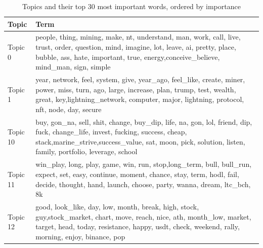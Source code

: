 \documentclass[
]{article}
\begin{document}
\begin{table}

\caption{\label{tab:topictable}Topics and their top 30 most important words, ordered by importance}
\centering
\begin{tabular}[t]{l|l}
\hline
Topic & Term\\
\hline
Topic 0 & people,           thing,          mining,            make,              nt,      understand,             man,            work,            call,            live,           trust,           order,        question,            mind,         imagine,             lot,           leave,              ai,          pretty,           place,          bubble,             ass,            hate,       important,            true,          energy,conceive\_believe,        mind\_man,            sign,          simple\\
\hline
Topic 1 & year,          network,             feel,           system,             give,         year\_ago,        feel\_like,           create,            miner,            power,             miss,             turn,              ago,            large,         increase,             plan,            trump,             test,           wealth,            great,              key,lightning\_network,         computer,            major,        lightning,         protocol,              nft,             node,              day,           secure\\
\hline
Topic 10 & buy,       gon\_na,         sell,         shit,       change,      buy\_dip,         life,           na,          gon,          lol,       friend,          dip,         fuck,  change\_life,       invest,      fucking,      success,        cheap,        stack,marine\_strive,success\_value,          sat,         moon,         pick,     solution,       listen,       family,    portfolio,     leverage,       school\\
\hline
Topic 11 & win\_play,     long,     play,     game,      win,      run,     stop,long\_term,     bull, bull\_run,   expect,      set,     easy, continue,   moment,   chance,     stay,     term,     hodl,     fail,   decide,  thought,     hand,   launch,   choose,    party,    wanna,    dream,  ltc\_bch,       8k\\
\hline
Topic 12 & good,   look\_like,         day,         low,       month,       break,        high,       stock,         guy,stock\_market,       chart,        move,       reach,        nice,         ath,   month\_low,      market,      target,        head,       today,  resistance,       happy,        usdt,       check,     weekend,       rally,     morning,       enjoy,     binance,         pop\\

\end{tabular}
\end{table}
\end{document}
